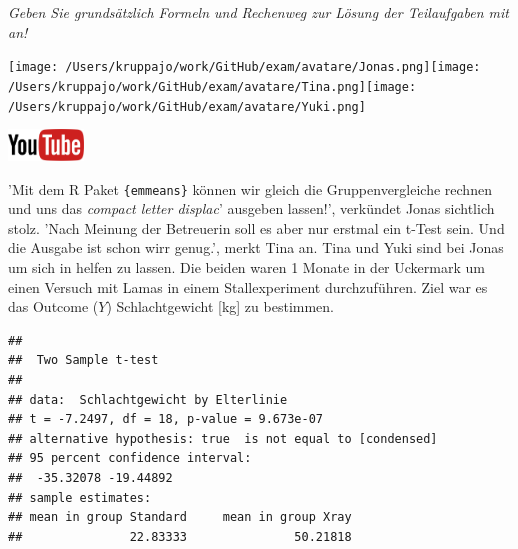 \documentclass[a4paper, 9pt]{scrartcl}\usepackage[]{graphicx}\usepackage[]{xcolor}
\makeatletter
\newenvironment{kframe}{%
 \def\at@end@of@kframe{}%
 \ifinner\ifhmode%
  \def\at@end@of@kframe{\end{minipage}}%
  \begin{minipage}{\columnwidth}%
 \fi\fi%
 \def\FrameCommand##1{\hskip\@totalleftmargin \hskip-\fboxsep
 \colorbox{shadecolor}{##1}\hskip-\fboxsep
     \hskip-\linewidth \hskip-\@totalleftmargin \hskip\columnwidth}%
 \MakeFramed {\advance\hsize-\width
   \@totalleftmargin\z@ \linewidth\hsize
   \@setminipage}}%
 {\par\unskip\endMakeFramed%
 \at@end@of@kframe}
\newenvironment{knitrout}{}{} %
\makeatother
\begin{document}
\textit{Geben Sie grundsätzlich Formeln und Rechenweg zur Lösung der Teilaufgaben mit an!} \\[1Ex]
 

 
\begin{minipage}[t]{0.5\textwidth}
\texttt{[image: /Users/kruppajo/work/GitHub/exam/avatare/Jonas.png]}\hspace{-4mm}\texttt{[image: /Users/kruppajo/work/GitHub/exam/avatare/Tina.png]}\hspace{-4mm}\texttt{[image: /Users/kruppajo/work/GitHub/exam/avatare/Yuki.png]}
\end{minipage}
\begin{minipage}[t]{0.5\textwidth}
\hfill
\href{https://youtu.be/w62HJlbN28U}{\includegraphics[width = 2cm]{img/youtube}}
\end{minipage}
\vspace{1ex}



'Mit dem R Paket \texttt{\{emmeans\}} können wir gleich die Gruppenvergleiche rechnen und uns das \textit{compact letter displac}' ausgeben lassen!', verkündet Jonas sichtlich stolz. 'Nach Meinung der Betreuerin soll es aber nur erstmal ein t-Test sein. Und die Ausgabe ist schon wirr genug.', merkt Tina an. Tina und Yuki sind bei Jonas um sich in \Rlogo helfen zu lassen. Die beiden waren 1 Monate in der Uckermark um einen Versuch mit Lamas in einem Stallexperiment durchzuführen. Ziel war es das Outcome ($Y$) Schlachtgewicht [kg] zu bestimmen.

\begin{knitrout}
\color{fgcolor}\begin{kframe}
\begin{verbatim}
## 
## 	Two Sample t-test
## 
## data:  Schlachtgewicht by Elterlinie
## t = -7.2497, df = 18, p-value = 9.673e-07
## alternative hypothesis: true  is not equal to [condensed]
## 95 percent confidence interval:
##  -35.32078 -19.44892
## sample estimates:
## mean in group Standard     mean in group Xray 
##               22.83333               50.21818
\end{verbatim}
\end{kframe}
\end{knitrout}
\end{document}
